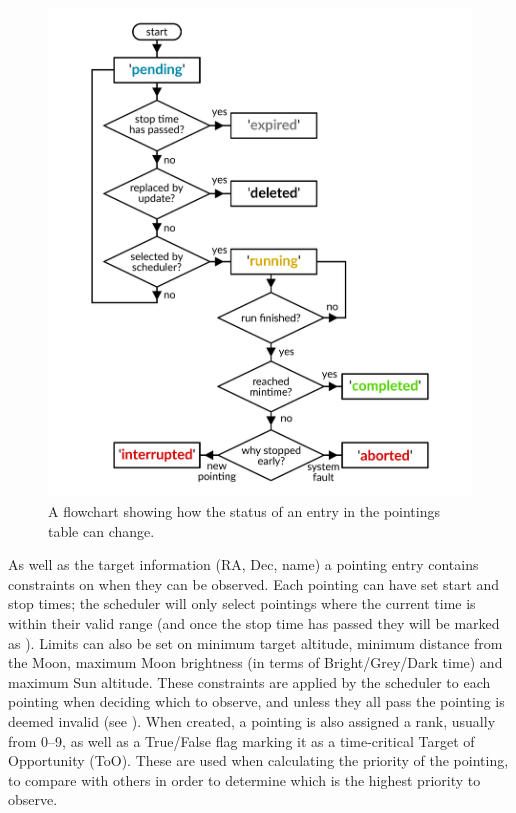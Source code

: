 \begin{colsection}
\begin{colsection}
\begin{figure}[p]
    \begin{center}
        \includegraphics[width=0.9\linewidth]{images/pointings_flowchart.pdf}
    \end{center}
    \caption[Pointing status progression flowchart]{
        A flowchart showing how the status of an entry in the pointings table can change.
    }\label{fig:pointings}
\end{figure}

\clearpage

As well as the target information (RA, Dec, name) a pointing entry contains constraints on when they can be observed. Each pointing can have set start and stop times; the scheduler will only select pointings where the current time is within their valid range (and once the stop time has passed they will be marked as ). Limits can also be set on minimum target altitude, minimum distance from the Moon, maximum Moon brightness (in terms of Bright/Grey/Dark time) and maximum Sun altitude. These constraints are applied by the scheduler to each pointing when deciding which to observe, and unless they all pass the pointing is deemed invalid (see ). When created, a pointing is also assigned a rank, usually from 0--9, as well as a True/False flag marking it as a time-critical Target of Opportunity (ToO). These are used when calculating the priority of the pointing, to compare with others in order to determine which is the highest priority to observe.


\end{colsection}
\end{colsection}
